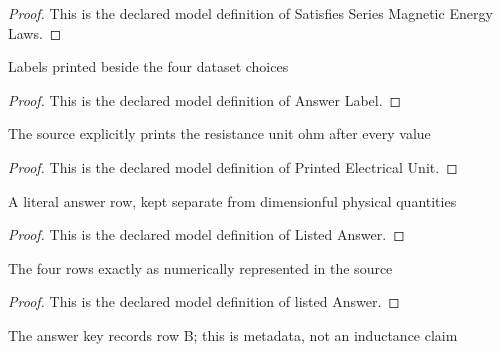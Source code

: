 \begin{proof}
  This is the declared model definition of Satisfies Series Magnetic Energy Laws.
\end{proof}
\begin{definition}
  \label{def:physics:phyx-mini-0990:phyxminiproblems-problemphyxmini0990-answerlabel}
  Labels printed beside the four dataset choices
\end{definition}
\begin{proof}
  This is the declared model definition of Answer Label.
\end{proof}
\begin{definition}
  \label{def:physics:phyx-mini-0990:phyxminiproblems-problemphyxmini0990-printedelectricalunit}
  The source explicitly prints the resistance unit ohm after every value
\end{definition}
\begin{proof}
  This is the declared model definition of Printed Electrical Unit.
\end{proof}
\begin{definition}
  \label{def:physics:phyx-mini-0990:phyxminiproblems-problemphyxmini0990-listedanswer}
  A literal answer row, kept separate from dimensionful physical quantities
\end{definition}
\begin{proof}
  This is the declared model definition of Listed Answer.
\end{proof}
\begin{definition}
  \label{def:physics:phyx-mini-0990:phyxminiproblems-problemphyxmini0990-listedanswer-value}
  The four rows exactly as numerically represented in the source
\end{definition}
\begin{proof}
  This is the declared model definition of listed Answer.
\end{proof}
\begin{definition}
  \label{def:physics:phyx-mini-0990:phyxminiproblems-problemphyxmini0990-recordeddatasetanswer}
  The answer key records row B; this is metadata, not an inductance claim
\end{definition}
